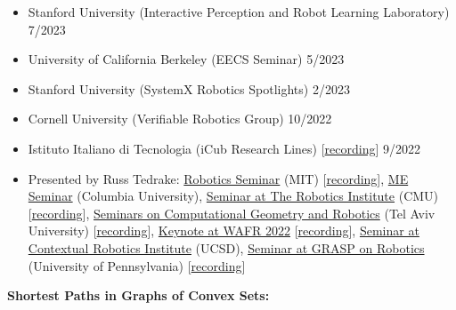 \documentclass[11pt,a4paper,sans]{moderncv}
\begin{document}
\vspace{5pt}

\begin{itemize}

\item Stanford University (Interactive Perception and Robot Learning Laboratory) \hfill 7/2023
\item University of California Berkeley (EECS Seminar) \hfill 5/2023
\item Stanford University (SystemX Robotics Spotlights) \hfill 2/2023
\item Cornell University (Verifiable Robotics Group) \hfill 10/2022
\item  Istituto Italiano di Tecnologia (iCub Research Lines) [\href{https://www.youtube.com/watch?v=FoqAAgqgn-o}{\color{orange}recording}] \hfill 9/2022

\item
Presented by Russ Tedrake:
\href{https://robotics.mit.edu/robotics-seminar}{\color{cyan}Robotics Seminar} (MIT)
[\href{https://www.youtube.com/watch?v=JZokn4Pc-YY}{\color{orange}recording}],
\href{https://events.columbia.edu/cal/event/showEventMore.rdo}{\color{cyan}ME Seminar} (Columbia University),
\href{https://www.ri.cmu.edu/event/ri-seminar-russ-tedrake-mit-professor-2023-01-27/}{\color{cyan}Seminar at The Robotics Institute} (CMU)
[\href{https://www.youtube.com/watch?v=KSCC7mVJzaw}{\color{orange}recording}],
\href{http://acg.cs.tau.ac.il/cg-seminar/2023/Motion\%20Planning\%20Around\%20Obstacles\%20with\%20Convex\%20Optimization}{\color{cyan}Seminars on Computational Geometry and Robotics} (Tel Aviv University)
[\href{https://www.youtube.com/watch?v=5E2OaizkJEs}{\color{orange}recording}],
\href{https://wafr2022.github.io/index.html#keynotes}{\color{cyan}Keynote at WAFR 2022}
[\href{https://youtu.be/NBR2G4gD7XI?t=5911}{\color{orange}recording}],
\href{http://cri.ucsd.edu/seminars/motion-planning-around-obstacles-convex-optimization}{\color{cyan}Seminar at Contextual Robotics Institute} (UCSD),
\href{https://www.grasp.upenn.edu/events/grasp-on-robotics-russ-tedrake/}{\color{cyan}Seminar at GRASP on Robotics} (University of Pennsylvania) [\href{https://www.youtube.com/watch?v=wciDaoNSwwk}{\color{orange}recording}]



\end{itemize}

\vspace{5pt}

\textbf{Shortest Paths in Graphs of Convex Sets:}
\end{document}
